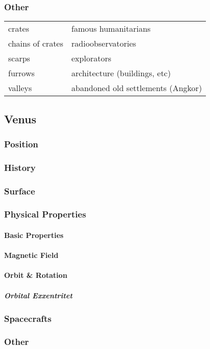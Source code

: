 \subsubsection{Other}
\begin{center}
	\begin{tabular}{l l}
		crates & famous humanitarians\\
		chains of crates & radioobservatories\\
		scarps & explorators\\
		furrows & architecture (buildings, etc)\\
		valleys & abandoned old settlements (Angkor)\\
	\end{tabular}
\end{center}

\subsection{Venus}
\label{planet:venus}
\subsubsection{Position}
\subsubsection{History}
\subsubsection{Surface}
\subsubsection{Physical Properties}
\paragraph{Basic Properties}
\paragraph{Magnetic Field}
\paragraph{Orbit \& Rotation}
\subparagraph{Orbital Exxentritet}
\subsubsection{Spacecrafts}
\subsubsection{Other}


